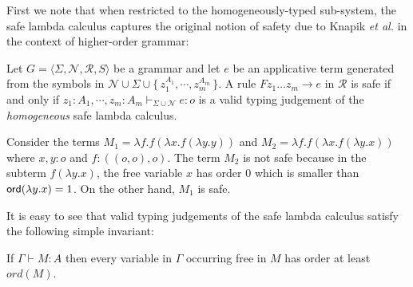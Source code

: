 \documentclass{llncs}
\newcommand\rulef[2]{\frac{\dps #1}{\dps #2}}
\newcommand\ord[1]{{\sf
    ord}(#1)} \newcommand\typear{\rightarrow}
\newcommand{\makeset}[1]{\{\,{#1}\,\}}
\begin{document}
First we note that when restricted to the homogeneously-typed
sub-system, the safe lambda calculus captures the original notion
of safety due to Knapik \emph{et al.} in the context of higher-order
grammar:

\begin{proposition} Let $G = \langle \Sigma, \mathcal{N}, \mathcal{R},
  S \rangle$ be a grammar and let $e$ be an applicative term generated
  from the symbols in $\mathcal{N} \cup \Sigma \cup \makeset{z_1^{A_1},
    \cdots, z_m^{A_m}}$.  A rule $F z_1 \ldots z_m \rightarrow e$ in
  $\mathcal{R}$ is safe if and only if $ z_1 : A_1, \cdots, z_m : A_m
  \vdash_{\Sigma \cup \mathcal{N}} e : o$ is a valid typing judgement
  of the \emph{homogeneous} safe lambda calculus.
\end{proposition}

\begin{example}
\label{ex:kierstead}
Consider the terms $M_1 = \lambda f . f (\lambda x . f (\lambda y . y
))$ and $M_2 = \lambda f . f (\lambda x . f (\lambda y .x ))$ where
$x,y:o$ and $f:((o,o),o)$. The term $M_2$ is not safe because in the
subterm $f (\lambda y . x)$, the free variable $x$ has order $0$ which
is smaller than $\ord{\lambda y . x} = 1$.  On the other hand, $M_1$
is safe.
\end{example}

It is easy to see that valid typing judgements of the safe lambda
calculus satisfy the following simple invariant:
\begin{lemma}
\label{lem:ordfreevar}
If $\Gamma \vdash M : A$ then every variable in $\Gamma$ occurring
free in $M$ has order at least $ord(M)$.
\end{lemma}
\end{document}
